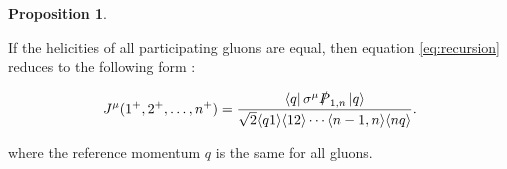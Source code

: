 \documentclass{article}
\theoremstyle{definition}
\newtheorem{prop}[theorem]{Proposition}
\numberwithin{equation}{section}
\begin{document}
\begin{prop}
\label{prop:Jppp}

    If the helicities of all participating gluons are equal, then equation \eqref{eq:recursion} reduces to the following form \cite{bg88recursive}:

    \begin{align}
        J^{\mu}(1^{+}, 2^{+}, \dots , n^{+}) = \frac{ \bra{q} \sigma^{\mu} \slashed{P}_{1,n} \ket{q} }{ \sqrt{2} \langle q1 \rangle \langle 12 \rangle \cdots \langle n-1,n \rangle \langle nq \rangle } \label{eq:prop1}.
    \end{align}

    where the reference momentum $q$ is the same for all gluons.

\end{prop}
\end{document}

